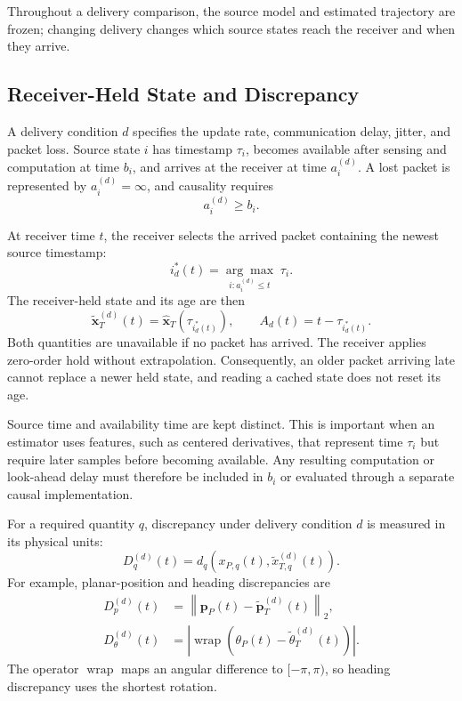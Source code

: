 \documentclass[journal]{IEEEtran}
\newcommand{\newrev}[1]{{#1}}
\begin{document}
Throughout a delivery comparison, the source model and estimated trajectory are frozen; changing delivery changes which source states reach the receiver and when they arrive.

\subsection{Receiver-Held State and Discrepancy}

A delivery condition $d$ specifies the update rate, communication delay, jitter, and packet loss. Source state $i$ has timestamp $\tau_i$, becomes available after sensing and computation at time $b_i$, and arrives at the receiver at time $a_i^{(d)}$. A lost packet is represented by $a_i^{(d)}=\infty$, and causality requires
\begin{equation}
a_i^{(d)}\geq b_i.
\end{equation}

At receiver time $t$, the receiver selects the arrived packet containing the newest source timestamp:
\begin{equation}
i_d^{*}(t)
=
\underset{i:a_i^{(d)}\leq t}{\arg\max}\;\tau_i.
\end{equation}
The receiver-held state and its age are then
\begin{equation}
\widetilde{\mathbf{x}}_{T}^{(d)}(t)
=
\widehat{\mathbf{x}}_{T}\!\left(\tau_{i_d^{*}(t)}\right),
\qquad
A_d(t)=t-\tau_{i_d^{*}(t)}.
\label{eq:receiver_state_age}
\end{equation}
Both quantities are unavailable if no packet has arrived. The receiver applies zero-order hold without extrapolation. Consequently, an older packet arriving late cannot replace a newer held state, and reading a cached state does not reset its age.

Source time and availability time are kept distinct. This is important when an estimator uses features, such as centered derivatives, that represent time $\tau_i$ but require later samples before becoming available. Any resulting computation or look-ahead delay must therefore be included in $b_i$ or evaluated through a separate causal implementation.

For a required quantity $q$, discrepancy under delivery condition $d$ is measured in its physical units:
\begin{equation}
D_q^{(d)}(t)
=
d_q\!\left(
x_{P,q}(t),
\widetilde{x}_{T,q}^{(d)}(t)
\right).
\end{equation}
For example, planar-position and heading discrepancies are
\begin{align}
D_p^{(d)}(t)
&=
\left\|
\mathbf{p}_{P}(t)
-
\widetilde{\mathbf{p}}_{T}^{(d)}(t)
\right\|_2,\\
D_{\theta}^{(d)}(t)
&=
\left|
\operatorname{wrap}\!\left(
\theta_{P}(t)
-
\widetilde{\theta}_{T}^{(d)}(t)
\right)
\right|.
\end{align}
\newrev{The operator $\operatorname{wrap}$ maps an angular difference to
$[-\pi,\pi)$, so heading discrepancy uses the shortest rotation.}
\end{document}
